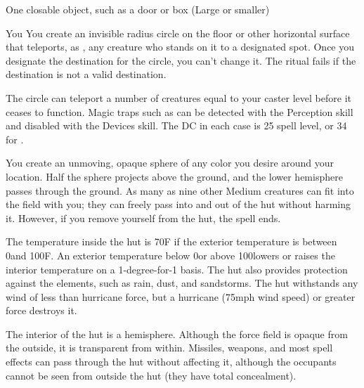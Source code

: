 \begin{spelltarget}{One closable object, such as a door or box (Large or smaller)}
\begin{spelltarget}{You}
\spelleffect You create an invisible \areasmall radius circle on the floor or other horizontal surface that teleports, as , any creature who stands on it to a designated spot. Once you designate the destination for the circle, you can't change it. The ritual fails if the destination is not a valid destination.
\par The circle can teleport a number of creatures equal to your caster level before it ceases to function.
\spellnotes Magic traps such as  can be detected with the Perception skill and disabled with the Devices skill. The DC in each case is 25 \add spell level, or 34 for .

\spelldur{\durext \dismissable}
\spelleffect You create an unmoving, opaque sphere of any color you desire around your location. Half the sphere projects above the ground, and the lower hemisphere passes through the ground. As many as nine other Medium creatures can fit into the field with you; they can freely pass into and out of the hut without harming it. However, if you remove yourself from the hut, the spell ends.
\par The temperature inside the hut is 70\degree F if the exterior temperature is between 0\degree and 100\degree F. An exterior temperature below 0\degree or above 100\degree lowers or raises the interior temperature on a 1-degree-for-1 basis. The hut also provides protection against the elements, such as rain, dust, and sandstorms. The hut withstands any wind of less than hurricane force, but a hurricane (75\add mph wind speed) or greater force destroys it.
\par The interior of the hut is a hemisphere. Although the force field is opaque from the outside, it is transparent from within. Missiles, weapons, and most spell effects can pass through the hut without affecting it, although the occupants cannot be seen from outside the hut (they have total concealment).


\end{spelltarget}
\end{spelltarget}
